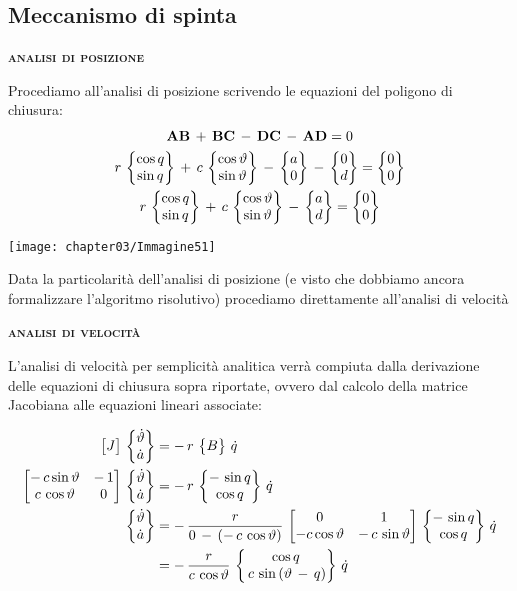 		\subsection{Meccanismo di spinta}
		
		\begin{center}
			{\scshape{\bfseries analisi di posizione}}
		\end{center}		
		
		\begin{minipage}{.5\textwidth}
		Procediamo all'analisi di posizione scrivendo le equazioni del poligono di chiusura:
		\begin{gather*}
			\mathbf{AB}\,+\,\mathbf{BC}\,-\,\mathbf{DC}\,-\,\mathbf{AD} = 0\\
			r\,\begin{Bmatrix}\cos{q}\\\sin{q}\end{Bmatrix}\,+\,c\,\begin{Bmatrix}\cos{\vartheta}\\\sin{\vartheta}\end{Bmatrix}\,-\,\begin{Bmatrix}a\\0\end{Bmatrix}\,-\,\begin{Bmatrix}0\\d\end{Bmatrix} = \begin{Bmatrix}0\\0\end{Bmatrix}\\
			r\,\begin{Bmatrix}\cos{q}\\\sin{q}\end{Bmatrix}\,+\,c\,\begin{Bmatrix}\cos{\vartheta}\\\sin{\vartheta}\end{Bmatrix}\,-\,\begin{Bmatrix}a\\d\end{Bmatrix} = \begin{Bmatrix}0\\0\end{Bmatrix}
		\end{gather*}
		\end{minipage}
		\hfill
		\begin{minipage}{.5\textwidth}
		\centering
		\texttt{[image: chapter03/Immagine51]}
		\end{minipage}
		
	Data la particolarità dell'analisi di posizione (e visto che dobbiamo ancora formalizzare l'algoritmo risolutivo) procediamo direttamente all'analisi di velocità
	
	\begin{center}
			{\scshape{\bfseries analisi di velocità}}
		\end{center}
		
		L'analisi di velocità per semplicità analitica verrà compiuta dalla derivazione delle equazioni di chiusura sopra riportate, ovvero dal calcolo della matrice Jacobiana alle equazioni lineari associate:
		
		\begin{align*}
				\begin{bmatrix}J\end{bmatrix}\,\begin{Bmatrix}\dot{\vartheta}\\\dot{a}\end{Bmatrix}&=-\,r\,\begin{Bmatrix}B\end{Bmatrix}\,\dot{q}\\
				\begin{bmatrix}-\,c\sin{\vartheta} & -\,1\\c\,\cos{\vartheta} & 0\end{bmatrix}\,\begin{Bmatrix}\dot{\vartheta}\\\dot{a}\end{Bmatrix}&= -\,r\,\begin{Bmatrix}-\,\sin{q}\\\cos{q}\end{Bmatrix}\,\dot{q}\\
				\begin{Bmatrix}\dot{\vartheta}\\\dot{a}\end{Bmatrix} &= -\,\frac{r}{0\,-\,(-\,c\,\cos{\vartheta})}\,\begin{bmatrix}0&1\\-c\cos{\vartheta}&-\,c\,\sin{\vartheta}\end{bmatrix}\,\begin{Bmatrix}-\,\sin{q}\\\cos{q}\end{Bmatrix}\,\dot{q}\\
				&= -\,\frac{r}{c\,\cos{\vartheta}}\,\begin{Bmatrix}\cos{q}\\\,c\,\sin{(\vartheta\,-\,q)}\end{Bmatrix}\,\dot{q}
		\end{align*}
		
